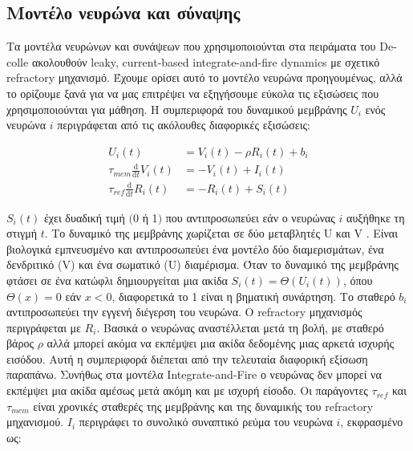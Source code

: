 \documentclass[12pt]{report}
\begin{document}
\subsection{Μοντέλο νευρώνα και σύναψης}
Τα μοντέλα νευρώνων και συνάψεων που χρησιμοποιούνται στα πειράματα του \textlatin{Decolle} ακολουθούν \textlatin{leaky, current-based integrate-and-fire dynamics} με σχετικό \textlatin{refractory} μηχανισμό. Έχουμε ορίσει αυτό το μοντέλο νευρώνα προηγουμένως, αλλά το ορίζουμε ξανά για να μας επιτρέψει να εξηγήσουμε εύκολα τις εξισώσεις που χρησιμοποιούνται για μάθηση. Η συμπεριφορά του δυναμικού μεμβράνης $U_{i}$ ενός νευρώνα $i$ περιγράφεται από τις ακόλουθες διαφορικές εξισώσεις:

\begin{equation}
\begin{aligned}
U_{i}(t) &=V_{i}(t)-\rho R_{i}(t)+b_{i} \\
\tau_{m e m} \frac{\mathrm{d}}{\mathrm{d} t} V_{i}(t) &=-V_{i}(t)+I_{i}(t) \\
\tau_{r e f} \frac{\mathrm{d}}{\mathrm{d} t} R_{i}(t) &=-R_{i}(t)+S_{i}(t)
\end{aligned}
\end{equation}

$S_{i}(t)$ έχει δυαδική τιμή $(0$ ή 1$)$ που αντιπροσωπεύει εάν ο νευρώνας $i$ αυξήθηκε τη στιγμή $t$. Το δυναμικό της μεμβράνης χωρίζεται σε δύο μεταβλητές \textlatin{U} και \textlatin{V} . Είναι βιολογικά εμπνευσμένο και αντιπροσωπεύει ένα μοντέλο δύο διαμερισμάτων, ένα δενδριτικό (\textlatin{V}) και ένα σωματικό (\textlatin{U}) διαμέρισμα. Όταν το δυναμικό της μεμβράνης φτάσει σε ένα κατώφλι δημιουργείται μια ακίδα $S_{i}(t)=\Theta\left(U_{i}(t)\right)$, όπου $\Theta(x)=0$ εάν $x<0$, διαφορετικά το 1 είναι η βηματική συνάρτηση. Το σταθερό $b_{i}$  αντιπροσωπεύει την εγγενή διέγερση του νευρώνα. Ο \textlatin{refractory} μηχανισμός περιγράφεται με $R_{i}$. Βασικά ο νευρώνας αναστέλλεται μετά τη βολή, με σταθερό βάρος $\rho$ αλλά μπορεί ακόμα να εκπέμψει μια ακίδα δεδομένης μιας αρκετά ισχυρής εισόδου. Αυτή η συμπεριφορά διέπεται από την τελευταία διαφορική εξίσωση παραπάνω. Συνήθως στα μοντέλα \textlatin{Integrate-and-Fire} ο νευρώνας δεν μπορεί να εκπέμψει μια ακίδα αμέσως μετά ακόμη και με ισχυρή είσοδο. Οι παράγοντες $\tau_{r e f}$ και $\tau_{m e m}$ είναι χρονικές σταθερές της μεμβράνης και της δυναμικής του \textlatin{refractory} μηχανισμού. $I_{i}$ περιγράφει το συνολικό συναπτικό ρεύμα του νευρώνα $i$, εκφρασμένο ως:
\end{document}
